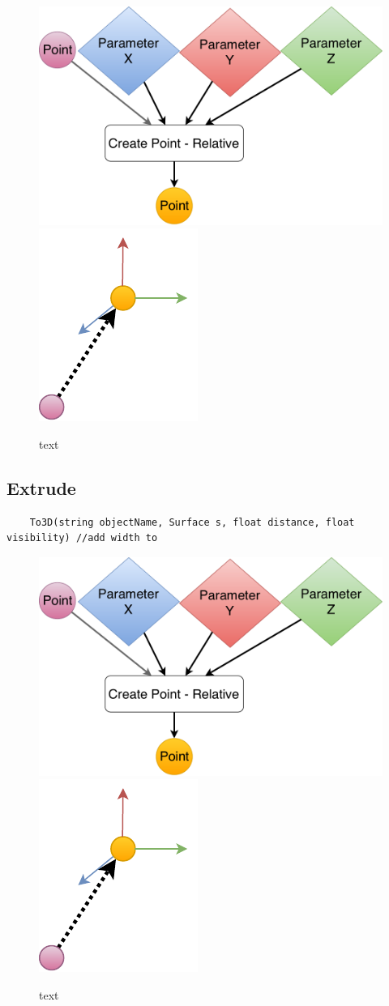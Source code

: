 \begin{figure}[H]
	\centering
	\includegraphics[height=0.3\textwidth]{obrazky-figures/Diagram/DP Navrh operacii-0D - Point2.pdf}
	\includegraphics[height=0.3\textwidth]{obrazky-figures/Diagram/Draw/1Points/DP Navrh operacii-0D - PointRelative.pdf}
	\caption{text}
	\label{fig:1}
\end{figure}


\subsection{Extrude} 
\begin{lstlisting}
    To3D(string objectName, Surface s, float distance, float visibility) //add width to 
\end{lstlisting}

\begin{figure}[H]
	\centering
	\includegraphics[height=0.3\textwidth]{obrazky-figures/Diagram/DP Navrh operacii-0D - Point2.pdf}
	\includegraphics[height=0.3\textwidth]{obrazky-figures/Diagram/Draw/1Points/DP Navrh operacii-0D - PointRelative.pdf}
	\caption{text}
	\label{fig:1}
\end{figure}


